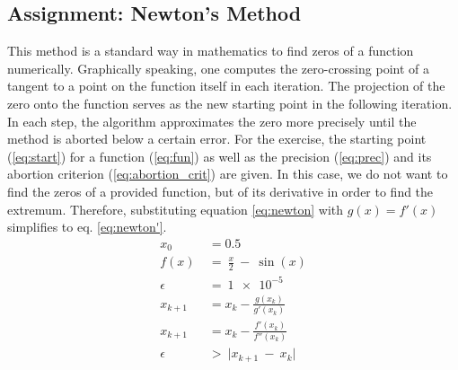 \subsection{Assignment: Newton's Method}
This method is a standard way in mathematics to find zeros of a function numerically. Graphically speaking, one computes the zero-crossing point of a tangent to a point on the function itself in each iteration. The projection of the zero onto the function serves as the new starting point in the following iteration. In each step, the algorithm approximates the zero more precisely until the method is aborted below a certain error.
For the exercise, the starting point (\ref{eq:start}) for a function (\ref{eq:fun}) as well as the precision (\ref{eq:prec}) and its abortion criterion (\ref{eq:abortion_crit}) are given. In this case, we do not want to find the zeros of a provided function, but of its derivative in order to find the extremum. Therefore, substituting equation \ref{eq:newton} with $g(x) = f'(x)$ simplifies to eq. \ref{eq:newton'}.
\begin{align}
    x_0 &= 0.5 \label{eq:start}\\
    f(x)\ &=\ \frac{x}{2}\ -\ \sin(x)\label{eq:fun}\\
    \epsilon\ &=\ \num{1e-5} \label{eq:prec}\\
     x_{k+1} &= x_k - \frac{g(x_k)}{g'(x_k)}\label{eq:newton}\\
    x_{k+1} &= x_k - \frac{f'(x_k)}{f''(x_k)} \label{eq:newton'}\\
    \epsilon\ &>\ \mathopen|x_{k+1}\ -\ x_k\mathclose| \label{eq:abortion_crit}
\end{align}

